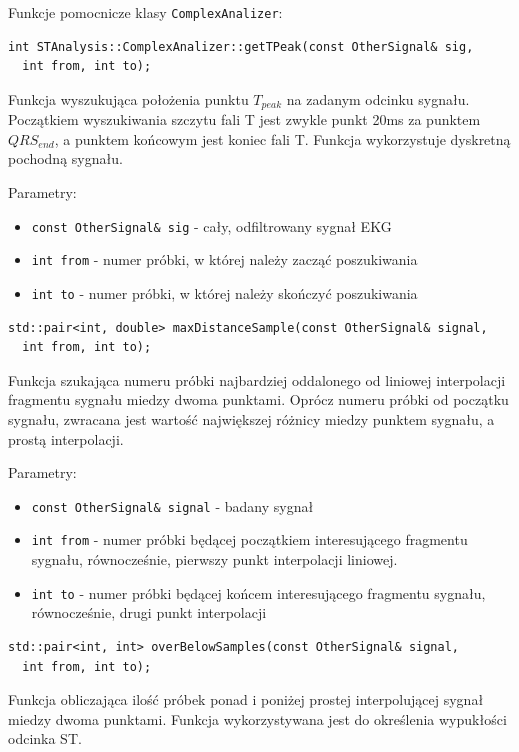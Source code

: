 \documentclass[a4paper, 11pt]{article}
\begin{document}
Funkcje pomocnicze klasy \verb|ComplexAnalizer|:

\begin{lstlisting}
int STAnalysis::ComplexAnalizer::getTPeak(const OtherSignal& sig,
  int from, int to);
\end{lstlisting}

Funkcja wyszukująca położenia punktu $T_{peak}$ na zadanym odcinku sygnału.
Początkiem wyszukiwania szczytu fali T jest zwykle punkt 20ms za punktem
$QRS_{end}$, a punktem końcowym jest koniec fali T. Funkcja wykorzystuje
dyskretną pochodną sygnału.

Parametry:
\begin{itemize}
  \item \verb|const OtherSignal& sig| - cały, odfiltrowany sygnał EKG
  \item \verb|int from| - numer próbki, w której należy zacząć poszukiwania
  \item \verb|int to| - numer próbki, w której należy skończyć poszukiwania
\end{itemize}


\begin{lstlisting}
std::pair<int, double> maxDistanceSample(const OtherSignal& signal, 
  int from, int to);
\end{lstlisting}

Funkcja szukająca numeru próbki najbardziej oddalonego od liniowej interpolacji
fragmentu sygnału miedzy dwoma punktami. Oprócz numeru próbki od początku
sygnału, zwracana jest wartość największej różnicy miedzy punktem sygnału, a
prostą interpolacji.

Parametry:
\begin{itemize}
  \item \verb|const OtherSignal& signal| - badany sygnał
  \item \verb|int from| - numer próbki będącej początkiem interesującego
    fragmentu sygnału, równocześnie, pierwszy punkt interpolacji liniowej.
  \item \verb|int to| - numer próbki będącej końcem interesującego fragmentu
    sygnału, równocześnie, drugi punkt interpolacji
\end{itemize}

\begin{lstlisting}
std::pair<int, int> overBelowSamples(const OtherSignal& signal,
  int from, int to);
\end{lstlisting}

Funkcja obliczająca ilość próbek ponad i poniżej prostej interpolującej sygnał
miedzy dwoma punktami. Funkcja wykorzystywana jest do określenia wypukłości
odcinka ST.
\end{document}
